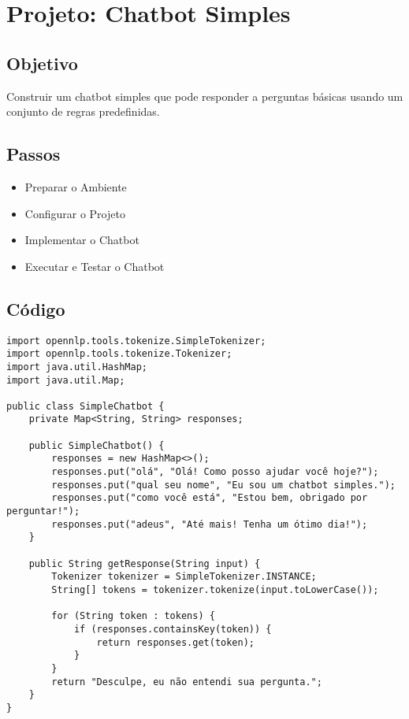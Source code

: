 \documentclass[a4paper,12pt]{book}
\begin{document}
\section{Projeto: Chatbot Simples}

\subsection{Objetivo}
Construir um chatbot simples que pode responder a perguntas básicas usando um conjunto de regras predefinidas.

\subsection{Passos}
\begin{itemize}
    \item Preparar o Ambiente
    \item Configurar o Projeto
    \item Implementar o Chatbot
    \item Executar e Testar o Chatbot
\end{itemize}

\subsection{Código}
\begin{lstlisting}
import opennlp.tools.tokenize.SimpleTokenizer;
import opennlp.tools.tokenize.Tokenizer;
import java.util.HashMap;
import java.util.Map;

public class SimpleChatbot {
    private Map<String, String> responses;

    public SimpleChatbot() {
        responses = new HashMap<>();
        responses.put("olá", "Olá! Como posso ajudar você hoje?");
        responses.put("qual seu nome", "Eu sou um chatbot simples.");
        responses.put("como você está", "Estou bem, obrigado por perguntar!");
        responses.put("adeus", "Até mais! Tenha um ótimo dia!");
    }

    public String getResponse(String input) {
        Tokenizer tokenizer = SimpleTokenizer.INSTANCE;
        String[] tokens = tokenizer.tokenize(input.toLowerCase());

        for (String token : tokens) {
            if (responses.containsKey(token)) {
                return responses.get(token);
            }
        }
        return "Desculpe, eu não entendi sua pergunta.";
    }
}
\end{lstlisting}
\end{document}
